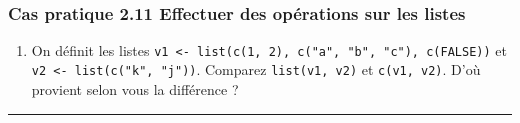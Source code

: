 \documentclass[12pt,twosided, notitlepage]{book}
\providecommand{\tightlist}{%
  \setlength{\itemsep}{0pt}\setlength{\parskip}{0pt}}
\newif \ifsol
\begin{document}
~

\subsubsection{\texorpdfstring{\textbf{Cas pratique 2.11} Effectuer des
opérations sur les
listes}{Cas pratique 2.11 Effectuer des opérations sur les listes}}\label{cas-pratique-2.11-effectuer-des-operations-sur-les-listes}


\begin{enumerate}
\def\labelenumi{\alph{enumi}.}
\tightlist
\item
  On définit les listes
  \texttt{v1\ \textless{}-\ list(c(1,\ 2),\ c("a",\ "b",\ "c"),\ c(FALSE))}
  et \texttt{v2\ \textless{}-\ list(c("k",\ "j"))}. Comparez
  \texttt{list(v1,\ v2)} et \texttt{c(v1,\ v2)}. D'où provient selon
  vous la différence ?
\end{enumerate}

\ifsol 

\begin{center} \rule{0.5\linewidth}{\linethickness}\end{center}
\end{document}
